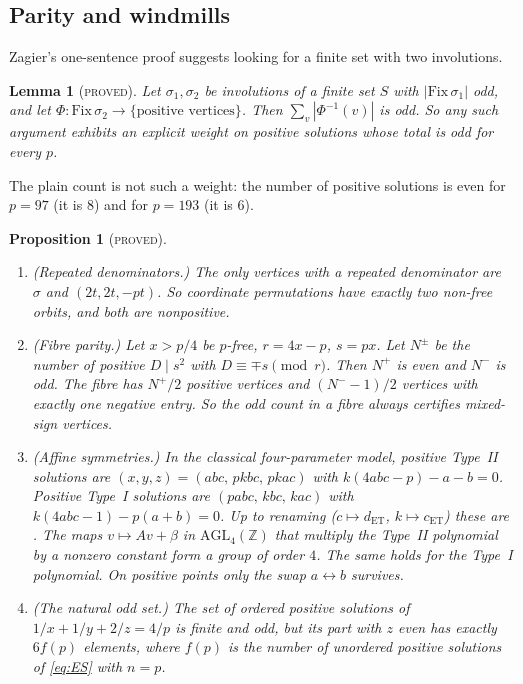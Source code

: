 \documentclass[11pt,reqno]{amsart}
\newtheorem{lemma}[theorem]{Lemma}
\newtheorem{proposition}[theorem]{Proposition}
\theoremstyle{definition}
\newcommand{\Z}{\mathbb Z}
\newcommand{\status}[1]{\textsc{#1}}
\begin{document}
\subsection{Parity and windmills}
Zagier's one-sentence proof \cite{Zagier} suggests looking for a finite set
with two involutions.

\begin{lemma}[\status{proved}]\label{lem:parity}
Let $\sigma_1,\sigma_2$ be involutions of a finite set $S$ with
$|\mathrm{Fix}\,\sigma_1|$ odd, and let
$\Phi:\mathrm{Fix}\,\sigma_2\to\{\text{positive vertices}\}$.  Then
$\sum_v|\Phi^{-1}(v)|$ is odd.  So any such argument exhibits an explicit
weight on positive solutions whose total is odd for every $p$.
\end{lemma}

The plain count is not such a weight: the number of positive solutions
is even for $p=97$ (it is $8$) and for $p=193$ (it is $6$).

\begin{proposition}[\status{proved}]\label{prop:windmill}
\leavevmode
\begin{enumerate}
\item \emph{(Repeated denominators.)} The only vertices with a repeated
denominator are $\sigma$ and $(2t,2t,-pt)$.  So coordinate permutations
have exactly two non-free orbits, and both are nonpositive.
\item \emph{(Fibre parity.)} Let $x>p/4$ be $p$-free, $r=4x-p$, $s=px$.  Let
$N^\pm$ be the number of positive $D\mid s^2$ with $D\equiv\mp s\pmod r$.
Then $N^+$ is even and $N^-$ is odd.  The fibre has $N^+/2$ positive
vertices and $(N^--1)/2$ vertices with exactly one negative entry.  So the
odd count in a fibre always certifies \emph{mixed-sign} vertices.
\item \emph{(Affine symmetries.)} In the classical four-parameter model,
positive Type~II solutions are $(x,y,z)=(abc,\,pkbc,\,pkac)$ with
$k(4abc-p)-a-b=0$.  Positive Type~I solutions are $(pabc,\,kbc,\,kac)$ with
$k(4abc-1)-p(a+b)=0$.  Up to renaming ($c\mapsto d_{\mathrm{ET}}$,
$k\mapsto c_{\mathrm{ET}}$) these are \cite[(2.3), (2.15), (2.22),
Prop.~2.2]{ET}.  The maps $v\mapsto Av+\beta$ in
$\mathrm{AGL}_4(\Z)$ that multiply the Type~II polynomial by a nonzero
constant form a group of order $4$.  The same holds for the Type~I
polynomial.  On positive points only the swap $a\leftrightarrow b$
survives.
\item \emph{(The natural odd set.)} The set of ordered positive solutions of
$1/x+1/y+2/z=4/p$ is finite and odd, but its part with $z$ even has exactly
$6f(p)$ elements, where $f(p)$ is the number of unordered positive
solutions of \eqref{eq:ES} with $n=p$.
\end{enumerate}
\end{proposition}
\end{document}

